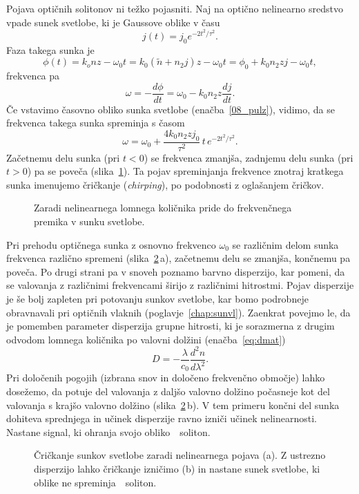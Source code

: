 Pojava optičnih solitonov ni težko pojasniti. Naj na optično nelinearno sredstvo
vpade sunek svetlobe, ki je Gaussove oblike v času
\begin{equation}
j(t) = j_0 e^{-2t^2/\tau^2}.
\label{08_pulz}
\end{equation}
Faza takega sunka je 
\begin{equation}
\phi (t) = k_o n z - \omega_0 t = k_0 (\tilde{n} + n_2 j)z - \omega_0 t = 
\phi_0 + k_0 n_2 z j - \omega_0 t,
\end{equation}
frekvenca pa 
\begin{equation}
\omega = -\frac{d\phi}{dt} = \omega_0 - k_0 n_2 z \frac{dj}{dt}.
\end{equation}
Če vstavimo časovno obliko sunka svetlobe (enačba~\ref{08_pulz}), vidimo, da se 
frekvenca takega sunka spreminja s časom
\begin{equation}
\omega = \omega_0 + \frac{4k_0 n_2 z j_0}{\tau^2} \, t \, e^{-2t^2/\tau^2}.
\end{equation}
Začetnemu delu sunka (pri $t<0$) se frekvenca zmanjša, zadnjemu delu sunka
(pri $t>0$) pa se poveča (slika~\ref{fig:optsoliton}). 
Ta pojav spreminjanja frekvence znotraj kratkega sunka imenujemo čričkanje 
({\it chirping}),  po podobnosti z oglašanjem čričkov.

\begin{figure}[h]
\centering
\def\svgwidth{80truemm} 

\caption{Zaradi nelinearnega lomnega količnika pride do frekvenčnega premika v sunku svetlobe.}
\label{fig:optsoliton}
\end{figure}
Pri prehodu optičnega sunka z osnovno frekvenco $\omega_0$ se različnim delom sunka
frekvenca različno spremeni (slika~\ref{fig:chirp}\,a), začetnemu delu se zmanjša, 
končnemu pa poveča. Po drugi strani pa v snoveh poznamo barvno disperzijo, 
kar pomeni, da se valovanja z različnimi frekvencami širijo z različnimi hitrostmi.
 Pojav disperzije je še bolj zapleten pri potovanju sunkov svetlobe,
kar bomo podrobneje obravnavali pri optičnih vlaknih (poglavje~\ref{chap:sunvl}).
Zaenkrat povejmo le, da je pomemben parameter disperzija grupne hitrosti, ki je sorazmerna
z drugim odvodom lomnega količnika po valovni dolžini (enačba~\ref{eq:dmat})
\begin{equation}
D = -\frac{\lambda}{c_0}\frac{d^2n}{d\lambda^2}.
\end{equation}
Pri določenih pogojih (izbrana snov in določeno frekvenčno območje) 
lahko dosežemo, da potuje del valovanja z daljšo valovno dolžino počasneje kot del valovanja
s krajšo valovno dolžino (slika~\ref{fig:chirp}\,b). V tem primeru končni del sunka 
dohiteva sprednjega in učinek disperzije ravno izniči učinek nelinearnosti. 
Nastane signal, ki ohranja svojo obliko~\textendash~soliton. 
\begin{figure}[h]
\centering
\def\svgwidth{145truemm} 

\caption{Čričkanje sunkov svetlobe zaradi nelinearnega pojava (a). Z ustrezno disperzijo lahko
čričkanje izničimo (b) in nastane sunek svetlobe, ki oblike ne spreminja~\textendash~soliton.}
\label{fig:chirp}
\end{figure}

